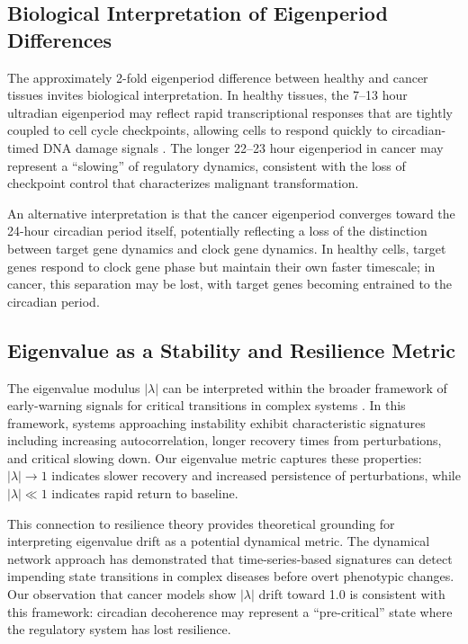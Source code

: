 \documentclass[11pt,a4paper]{article}
\begin{document}
\subsection{Biological Interpretation of Eigenperiod Differences}

The approximately 2-fold eigenperiod difference between healthy and cancer tissues invites biological interpretation. In healthy tissues, the 7--13 hour ultradian eigenperiod may reflect rapid transcriptional responses that are tightly coupled to cell cycle checkpoints, allowing cells to respond quickly to circadian-timed DNA damage signals \citep{matsuo2003control, geyfman2012brain}. The longer 22--23 hour eigenperiod in cancer may represent a ``slowing'' of regulatory dynamics, consistent with the loss of checkpoint control that characterizes malignant transformation.

An alternative interpretation is that the cancer eigenperiod converges toward the 24-hour circadian period itself, potentially reflecting a loss of the distinction between target gene dynamics and clock gene dynamics. In healthy cells, target genes respond to clock gene phase but maintain their own faster timescale; in cancer, this separation may be lost, with target genes becoming entrained to the circadian period.

\subsection{Eigenvalue as a Stability and Resilience Metric}

The eigenvalue modulus $|\lambda|$ can be interpreted within the broader framework of early-warning signals for critical transitions in complex systems \citep{scheffer2009early}. In this framework, systems approaching instability exhibit characteristic signatures including increasing autocorrelation, longer recovery times from perturbations, and critical slowing down. Our eigenvalue metric captures these properties: $|\lambda| \to 1$ indicates slower recovery and increased persistence of perturbations, while $|\lambda| \ll 1$ indicates rapid return to baseline.

This connection to resilience theory \citep{scheffer2009early} provides theoretical grounding for interpreting eigenvalue drift as a potential dynamical metric. The dynamical network approach \citep{chen2012biomarkers} has demonstrated that time-series-based signatures can detect impending state transitions in complex diseases before overt phenotypic changes. Our observation that cancer models show $|\lambda|$ drift toward 1.0 is consistent with this framework: circadian decoherence may represent a ``pre-critical'' state where the regulatory system has lost resilience.
\end{document}

